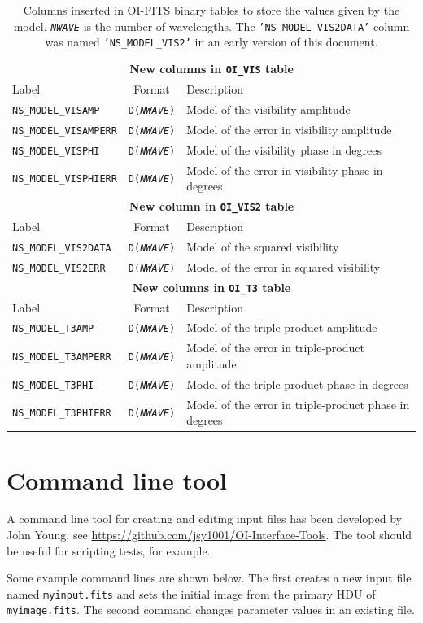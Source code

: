 \documentclass{article}
\newcommand*{\ROW}{} %
\newcommand*{\ROWTITLE}{} %
\newcommand{\oops}[1]{\DarkRed{#1}}
\newcommand{\STRING}[1]{\texttt{'#1'}} %
\begin{document}
\renewcommand{\ROW}[2]{\texttt{#1} & \texttt{D(\textsl{NWAVE})} & #2 \\}
\renewcommand{\ROWTITLE}[1]{\multicolumn{3}{c}{\textbf{#1}}\\}

\begin{table}
\caption{Columns inserted in OI-FITS binary tables to store the values given by
the model.  \texttt{\textsl{NWAVE}} is the number of wavelengths. The \STRING{NS\_MODEL\_VIS2DATA} column was named \STRING{NS\_MODEL\_VIS2} in an early version of this document.
\label{tab:model-columns}}
\begin{tabular}{lcl}
\hline
\hline
\ROWTITLE{New columns in \texttt{OI\_VIS} table}
Label & Format & Description \\
\hline
\ROW{NS\_MODEL\_VISAMP}{Model of the visibility amplitude}
\ROW{NS\_MODEL\_VISAMPERR}{Model of the error in visibility amplitude \oops{(optional)}}
\ROW{NS\_MODEL\_VISPHI}{Model of the visibility phase in degrees}
\ROW{NS\_MODEL\_VISPHIERR}{Model of the error in visibility phase in degrees \oops{(optional)}}
\hline
\hline
\ROWTITLE{New column in \texttt{OI\_VIS2} table}
Label & Format & Description \\
\hline
\ROW{NS\_MODEL\_VIS2DATA}{Model of the squared visibility}
\ROW{NS\_MODEL\_VIS2ERR}{Model of the error in squared visibility \oops{(optional)}}
\hline
\hline
\ROWTITLE{New columns in \texttt{OI\_T3} table}
Label & Format & Description \\
\hline
\ROW{NS\_MODEL\_T3AMP}{Model of the triple-product amplitude}
\ROW{NS\_MODEL\_T3AMPERR}{Model of the error in triple-product amplitude \oops{(optional)}}
\ROW{NS\_MODEL\_T3PHI}{Model of the triple-product phase in degrees}
\ROW{NS\_MODEL\_T3PHIERR}{Model of the error in triple-product phase in degrees \oops{(optional)}}
\hline
\end{tabular}
\end{table}

\section{Command line tool}

A command line tool for creating and editing input files has been developed
by John Young, see \url{https://github.com/jsy1001/OI-Interface-Tools}. The
tool should be useful for scripting tests, for example.

Some example command lines are shown below. The first creates a new input
file named \verb+myinput.fits+ and sets the initial image from the
primary HDU of \verb+myimage.fits+. The second command changes
parameter values in an existing file.
\end{document}

